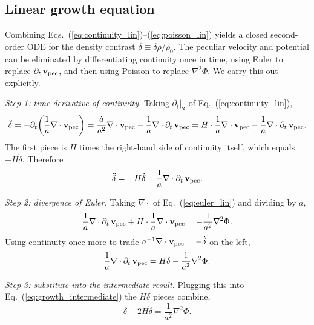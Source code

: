 \documentclass[12pt]{article}
\newcommand{\bx}{\mathbf{x}}
\newcommand{\bv}{\mathbf{v}}
\begin{document}
\subsection{Linear growth equation}
\label{sec:growth}

Combining Eqs.~(\ref{eq:continuity_lin})--(\ref{eq:poisson_lin})
yields a closed second-order ODE for the density contrast
$\delta \equiv \delta\rho/\rho_0$.  The peculiar velocity and
potential can be eliminated by differentiating continuity once in
time, using Euler to replace $\partial_t\,\bv_{\rm pec}$, and then using
Poisson to replace $\nabla^2\Phi$.  We carry this out explicitly.

\emph{Step 1: time derivative of continuity.}  Taking
$\partial_t|_\bx$ of Eq.~(\ref{eq:continuity_lin}),
%
\begin{equation}
  \ddot\delta
  = -\partial_t\!\left(\frac{1}{a}\nabla\cdot\bv_{\rm pec}\right)
  = \frac{\dot a}{a^2}\nabla\cdot\bv_{\rm pec}
    - \frac{1}{a}\nabla\cdot\partial_t\,\bv_{\rm pec}
  = H\cdot\frac{1}{a}\nabla\cdot\bv_{\rm pec}
    - \frac{1}{a}\nabla\cdot\partial_t\,\bv_{\rm pec}.
\end{equation}
%
The first piece is $H$ times the right-hand side of continuity
itself, which equals $-H\dot\delta$.  Therefore
%
\begin{equation}
  \ddot\delta
  = -H\dot\delta - \frac{1}{a}\nabla\cdot\partial_t\,\bv_{\rm pec}.
  \label{eq:growth_intermediate}
\end{equation}

\emph{Step 2: divergence of Euler.}  Taking $\nabla\cdot$ of
Eq.~(\ref{eq:euler_lin}) and dividing by $a$,
%
\begin{equation}
  \frac{1}{a}\nabla\cdot\partial_t\,\bv_{\rm pec}
  + H\cdot\frac{1}{a}\nabla\cdot\bv_{\rm pec}
  = -\frac{1}{a^2}\nabla^2\Phi.
\end{equation}
%
Using continuity once more to trade $a^{-1}\nabla\cdot\bv_{\rm pec} =
-\dot\delta$ on the left,
%
\begin{equation}
  \frac{1}{a}\nabla\cdot\partial_t\,\bv_{\rm pec}
  = H\dot\delta - \frac{1}{a^2}\nabla^2\Phi.
\end{equation}

\emph{Step 3: substitute into the intermediate result.}  Plugging
this into Eq.~(\ref{eq:growth_intermediate}) the $H\dot\delta$
pieces combine,
%
\begin{equation}
  \ddot\delta + 2H\dot\delta
  = \frac{1}{a^2}\nabla^2\Phi.
\end{equation}
\end{document}
